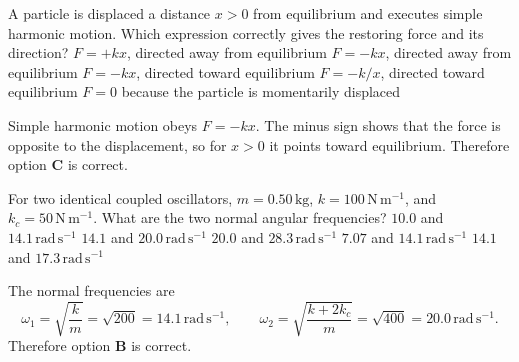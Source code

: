 
\begin{quizquestion}[
  id=phy104-osc-001,
  topic=oscillations,
  difficulty=foundation,
  marks=1,
  correct=C,
  tags={shm,restoring-force},
  outcome={Identify the direction of a restoring force}
]
  A particle is displaced a distance \(x>0\) from equilibrium and executes
  simple harmonic motion. Which expression correctly gives the restoring
  force and its direction?
  \choices
    {\(F=+kx\), directed away from equilibrium}
    {\(F=-kx\), directed away from equilibrium}
    {\(F=-kx\), directed toward equilibrium}
    {\(F=-k/x\), directed toward equilibrium}
    {\(F=0\) because the particle is momentarily displaced}
\end{quizquestion}
\begin{quizsolution}
  Simple harmonic motion obeys \(F=-kx\).  The minus sign shows that the
  force is opposite to the displacement, so for \(x>0\) it points toward
  equilibrium.  Therefore option \textbf{C} is correct.
\end{quizsolution}

\begin{quizquestion}[
  id=phy104-nm-026,
  topic=normal-modes,
  difficulty=applied,
  marks=2,
  correct=B,
  tags={coupled-oscillators,eigenfrequencies},
  outcome={Calculate the normal frequencies of a symmetric coupled system}
]
  For two identical coupled oscillators, \(m=0.50\,\mathrm{kg}\),
  \(k=100\,\mathrm{N\,m^{-1}}\), and
  \(k_c=50\,\mathrm{N\,m^{-1}}\). What are the two normal angular
  frequencies?
  \choices
    {\(10.0\) and \(14.1\,\mathrm{rad\,s^{-1}}\)}
    {\(14.1\) and \(20.0\,\mathrm{rad\,s^{-1}}\)}
    {\(20.0\) and \(28.3\,\mathrm{rad\,s^{-1}}\)}
    {\(7.07\) and \(14.1\,\mathrm{rad\,s^{-1}}\)}
    {\(14.1\) and \(17.3\,\mathrm{rad\,s^{-1}}\)}
\end{quizquestion}
\begin{quizsolution}
  The normal frequencies are
  \[
    \omega_1=\sqrt{\frac{k}{m}}=\sqrt{200}=14.1\,\mathrm{rad\,s^{-1}},
    \qquad
    \omega_2=\sqrt{\frac{k+2k_c}{m}}=\sqrt{400}=20.0\,\mathrm{rad\,s^{-1}}.
  \]
  Therefore option \textbf{B} is correct.
\end{quizsolution}

